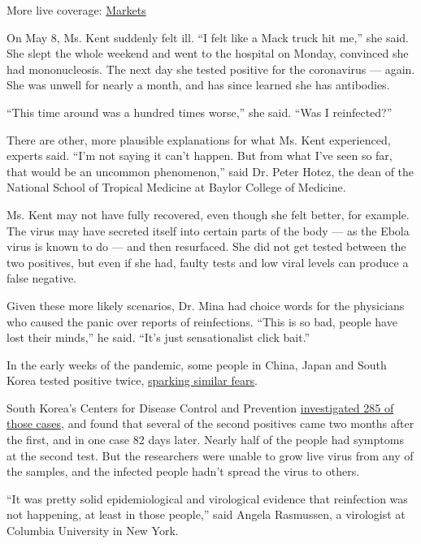 More live coverage:
\href{https://www.nytimes3xbfgragh.onion/live/2020/07/31/business/stock-market-today-coronavirus?action=click\&pgtype=Article\&state=default\&region=MAIN_CONTENT_1\&context=storylines_live_updates}{Markets}

On May 8, Ms. Kent suddenly felt ill. ``I felt like a Mack truck hit
me,'' she said. She slept the whole weekend and went to the hospital on
Monday, convinced she had mononucleosis. The next day she tested
positive for the coronavirus --- again. She was unwell for nearly a
month, and has since learned she has antibodies.

``This time around was a hundred times worse,'' she said. ``Was I
reinfected?''

There are other, more plausible explanations for what Ms. Kent
experienced, experts said. ``I'm not saying it can't happen. But from
what I've seen so far, that would be an uncommon phenomenon,'' said Dr.
Peter Hotez, the dean of the National School of Tropical Medicine at
Baylor College of Medicine.

Ms. Kent may not have fully recovered, even though she felt better, for
example. The virus may have secreted itself into certain parts of the
body --- as the Ebola virus is known to do --- and then resurfaced. She
did not get tested between the two positives, but even if she had,
faulty tests and low viral levels can produce a false negative.

Given these more likely scenarios, Dr. Mina had choice words for the
physicians who caused the panic over reports of reinfections. ``This is
so bad, people have lost their minds,'' he said. ``It's just
sensationalist click bait.''

In the early weeks of the pandemic, some people in China, Japan and
South Korea tested positive twice,
\href{https://www.nytimes3xbfgragh.onion/2020/02/29/health/coronavirus-reinfection.html}{sparking
similar fears}.

South Korea's Centers for Disease Control and Prevention
\href{https://www.cdc.go.kr/board/board.es?mid=a30402000000\&bid=0030}{investigated
285 of those cases}, and found that several of the second positives came
two months after the first, and in one case 82 days later. Nearly half
of the people had symptoms at the second test. But the researchers were
unable to grow live virus from any of the samples, and the infected
people hadn't spread the virus to others.

``It was pretty solid epidemiological and virological evidence that
reinfection was not happening, at least in those people,'' said Angela
Rasmussen, a virologist at Columbia University in New York.

